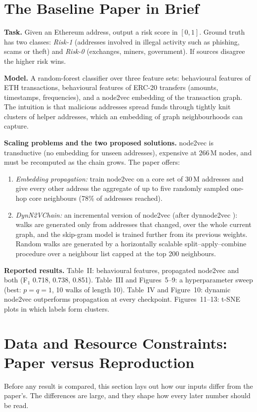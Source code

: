 \section{The Baseline Paper in Brief}
\label{sec:paper}
\textbf{Task.} Given an Ethereum address, output a risk score in $[0,1]$. Ground truth has two classes: \emph{Risk-1} (addresses involved in illegal activity such as phishing, scams or theft) and \emph{Risk-0} (exchanges, miners, government). If sources disagree the higher risk wins.

\textbf{Model.} A random-forest classifier over three feature sets: behavioural features of ETH transactions, behavioural features of ERC-20 transfers (amounts, timestamps, frequencies), and a node2vec embedding of the transaction graph. The intuition is that malicious addresses spread funds through tightly knit clusters of helper addresses, which an embedding of graph neighbourhoods can capture.

\textbf{Scaling problems and the two proposed solutions.} node2vec is transductive (no embedding for unseen addresses), expensive at 266\,M nodes, and must be recomputed as the chain grows. The paper offers:
\begin{enumerate}
\item \emph{Embedding propagation:} train node2vec on a core set of 30\,M addresses and give every other address the aggregate of up to five randomly sampled one-hop core neighbours (78\% of addresses reached).
\item \emph{DynN2VChain:} an incremental version of node2vec (after dynnode2vec \cite{dynnode2vec}): walks are generated only from addresses that changed, over the whole current graph, and the skip-gram model is trained further from its previous weights. Random walks are generated by a horizontally scalable split--apply--combine procedure over a neighbour list capped at the top 200 neighbours.
\end{enumerate}

\textbf{Reported results.} Table~II: behavioural features, propagated node2vec and both (F$_1$ 0.718, 0.738, 0.851). Table~III and Figures~5--9: a hyperparameter sweep (best: $p=q=1$, 10 walks of length 10). Table~IV and Figure~10: dynamic node2vec outperforms propagation at every checkpoint. Figures~11--13: t-SNE plots in which labels form clusters.

\section{Data and Resource Constraints: Paper versus Reproduction}
\label{sec:constraints}
Before any result is compared, this section lays out how our inputs differ from the paper's. The differences are large, and they shape how every later number should be read.

